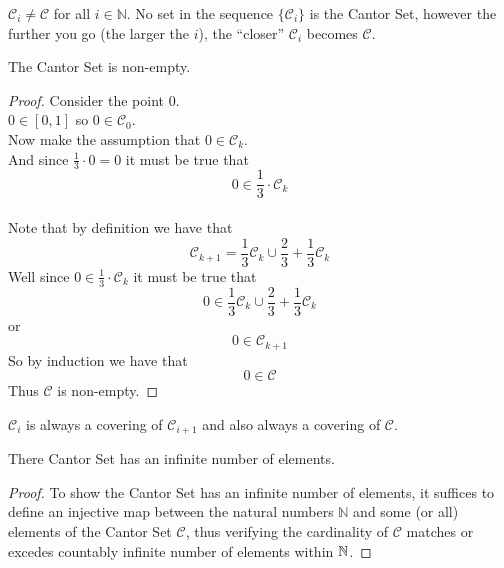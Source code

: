 \documentclass[11pt]{ekblite}
\begin{document}
	\begin{corollary}
		$\mathcal{C}_i \ne \mathcal{C}$ for all $i \in \mathbb{N}$. No set in the sequence $\{\mathcal{C}_i\}$ is the Cantor Set, however the further you go (the larger the $i$), the ``closer'' $\mathcal{C}_i$ becomes $\mathcal{C}$. 
	\end{corollary}
	\begin{corollary}
		The Cantor Set is non-empty.
	\end{corollary}
	\begin{proof}Consider the point 0.
	\\[0.2in]$0 \in [0,1]$ so $0 \in \mathcal{C}_0$.
	\\[0.2in]Now make the assumption that $0 \in \mathcal{C}_k$.
	\\[0.2in]And since $\frac{1}{3} \cdot 0 = 0$ it must be true that
	\[0 \in \frac{1}{3} \cdot \mathcal{C}_k\] 
	\\[0.2in]Note that by definition we have that
	\[\mathcal{C}_{k+1} = \frac{1}{3} \mathcal{C}_{k} \cup \frac{2}{3} + \frac{1}{3} \mathcal{C}_{k}\]
	Well since $0 \in \frac{1}{3} \cdot \mathcal{C}_k$ it must be true that
	\[0 \in \frac{1}{3} \mathcal{C}_{k} \cup \frac{2}{3} + \frac{1}{3} \mathcal{C}_{k}\]
	or
	\[0 \in \mathcal{C}_{k+1}\]
	So by induction we have that
	\[0 \in \mathcal{C}\]
	Thus $\mathcal{C}$ is non-empty.
	\end{proof}
	\begin{corollary}
		$\mathcal{C}_{i}$ is always a covering of $\mathcal{C}_{i+1}$ and also always a covering of $\mathcal{C}$.
	\end{corollary}
	\begin{corollary}
		There Cantor Set has an infinite number of elements.
	\end{corollary}
	\begin{proof}
		To show the Cantor Set has an infinite number of elements, it suffices to define an injective map between the natural numbers $\mathbb{N}$ and some (or all) elements of the Cantor Set $\mathcal{C}$, thus verifying the cardinality of $\mathcal{C}$ matches or excedes countably infinite number of elements within $\mathbb{N}$.
	\end{proof}
	\newpage
\end{document}
